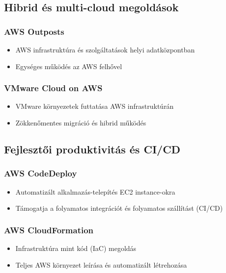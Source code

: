 \documentclass[a4paper,12pt]{article}
\begin{document}
    \subsection{Hibrid és multi-cloud megoldások}

    \subsubsection{AWS Outposts}

    \begin{itemize}
        \item AWS infrastruktúra és szolgáltatások helyi adatközpontban
        \item Egységes működés az AWS felhővel
    \end{itemize}

    \subsubsection{VMware Cloud on AWS}

    \begin{itemize}
        \item VMware környezetek futtatása AWS infrastruktúrán
        \item Zökkenőmentes migráció és hibrid működés
    \end{itemize}

    \subsection{Fejlesztői produktivitás és CI/CD}

    \subsubsection{AWS CodeDeploy}

    \begin{itemize}
        \item Automatizált alkalmazás-telepítés EC2 instance-okra
        \item Támogatja a folyamatos integrációt és folyamatos szállítást (CI/CD)
    \end{itemize}

    \subsubsection{AWS CloudFormation}

    \begin{itemize}
        \item Infrastruktúra mint kód (IaC) megoldás
        \item Teljes AWS környezet leírása és automatizált létrehozása
    \end{itemize}
\end{document}
